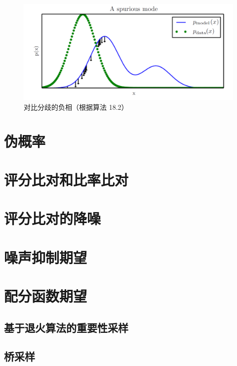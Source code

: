 \begin{figure}[htbp] %
   \centering
   \includegraphics[width=\textwidth]{fig/chap18/18_2.png} 
   \caption{对比分歧的负相（根据算法 18.2）}
   \label{fig:18.2}
\end{figure}

\section{伪概率}
\label{sec:18.3}

\section{评分比对和比率比对}
\label{sec:18.4}

\section{评分比对的降噪}
\label{sec:18.5}

\section{噪声抑制期望}
\label{sec:18.6}

\section{配分函数期望}
\label{sec:18.7}

\subsection{基于退火算法的重要性采样}
\label{sec:18.7.1}

\subsection{桥采样}
\label{sec:18.7.2}